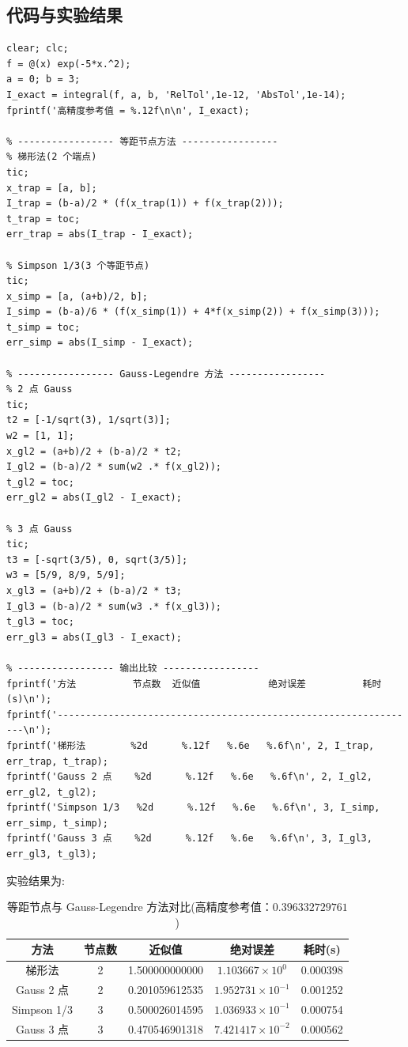 \documentclass[12pt,a4paper]{ctexart}
\begin{document}
\subsection{代码与实验结果}
\begin{lstlisting}
clear; clc;
f = @(x) exp(-5*x.^2);
a = 0; b = 3;
I_exact = integral(f, a, b, 'RelTol',1e-12, 'AbsTol',1e-14);
fprintf('高精度参考值 = %.12f\n\n', I_exact);

% ----------------- 等距节点方法 -----------------
% 梯形法(2 个端点)
tic;
x_trap = [a, b];
I_trap = (b-a)/2 * (f(x_trap(1)) + f(x_trap(2)));
t_trap = toc;
err_trap = abs(I_trap - I_exact);

% Simpson 1/3(3 个等距节点)
tic;
x_simp = [a, (a+b)/2, b];
I_simp = (b-a)/6 * (f(x_simp(1)) + 4*f(x_simp(2)) + f(x_simp(3)));
t_simp = toc;
err_simp = abs(I_simp - I_exact);

% ----------------- Gauss-Legendre 方法 -----------------
% 2 点 Gauss
tic;
t2 = [-1/sqrt(3), 1/sqrt(3)];
w2 = [1, 1];
x_gl2 = (a+b)/2 + (b-a)/2 * t2;
I_gl2 = (b-a)/2 * sum(w2 .* f(x_gl2));
t_gl2 = toc;
err_gl2 = abs(I_gl2 - I_exact);

% 3 点 Gauss
tic;
t3 = [-sqrt(3/5), 0, sqrt(3/5)];
w3 = [5/9, 8/9, 5/9];
x_gl3 = (a+b)/2 + (b-a)/2 * t3;
I_gl3 = (b-a)/2 * sum(w3 .* f(x_gl3));
t_gl3 = toc;
err_gl3 = abs(I_gl3 - I_exact);

% ----------------- 输出比较 -----------------
fprintf('方法          节点数  近似值            绝对误差          耗时(s)\n');
fprintf('----------------------------------------------------------------\n');
fprintf('梯形法        %2d      %.12f   %.6e   %.6f\n', 2, I_trap, err_trap, t_trap);
fprintf('Gauss 2 点    %2d      %.12f   %.6e   %.6f\n', 2, I_gl2, err_gl2, t_gl2);
fprintf('Simpson 1/3   %2d      %.12f   %.6e   %.6f\n', 3, I_simp, err_simp, t_simp);
fprintf('Gauss 3 点    %2d      %.12f   %.6e   %.6f\n', 3, I_gl3, err_gl3, t_gl3);
\end{lstlisting}
实验结果为:
\begin{table}[H]
    \centering
    \caption{等距节点与 Gauss-Legendre 方法对比(高精度参考值：$0.396332729761$)}
    \label{tab:gauss_vs_equidistant}
    \small
    \begin{tabular}{ccccc}
        \toprule
        方法 & 节点数 & 近似值 & 绝对误差 & 耗时(s) \\
        \midrule
        梯形法        & 2 & 1.500000000000 & $1.103667\times10^{0}$  & 0.000398 \\
        Gauss 2 点    & 2 & 0.201059612535 & $1.952731\times10^{-1}$ & 0.001252 \\
        Simpson 1/3   & 3 & 0.500026014595 & $1.036933\times10^{-1}$ & 0.000754 \\
        Gauss 3 点    & 3 & 0.470546901318 & $7.421417\times10^{-2}$ & 0.000562 \\
        \bottomrule
    \end{tabular}
\end{table}
\end{document}
